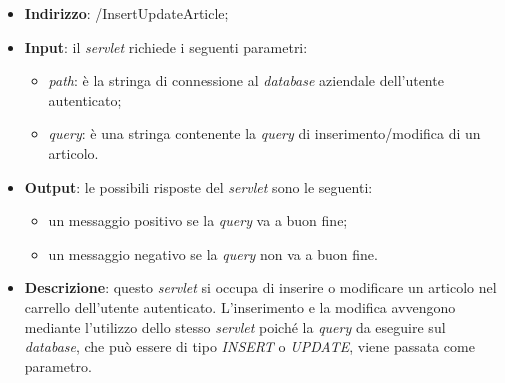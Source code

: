 
\begin{itemize}
	\item \textbf{Indirizzo}: /InsertUpdateArticle;
	\item \textbf{Input}: il \textit{servlet} richiede i seguenti parametri:
		\begin{itemize}
			\item \textit{path}: è la stringa di connessione al \textit{database} aziendale dell'utente autenticato;
			\item \textit{query}: è una stringa contenente la \textit{query} di inserimento/modifica di un articolo.
		\end{itemize}
	\item \textbf{Output}: le possibili risposte del \textit{servlet} sono le seguenti:
		\begin{itemize}
			\item un messaggio positivo se la \textit{query} va a buon fine;
			\item un messaggio negativo se la \textit{query} non va a buon fine.
		\end{itemize}
	\item \textbf{Descrizione}: questo \textit{servlet} si occupa di inserire o modificare un articolo nel carrello dell'utente autenticato. L'inserimento e la modifica avvengono mediante l'utilizzo dello stesso \textit{servlet} poiché la \textit{query} da eseguire sul \textit{database}, che può essere di tipo \textit{INSERT} o \textit{UPDATE}, viene passata come parametro.
\end{itemize}


